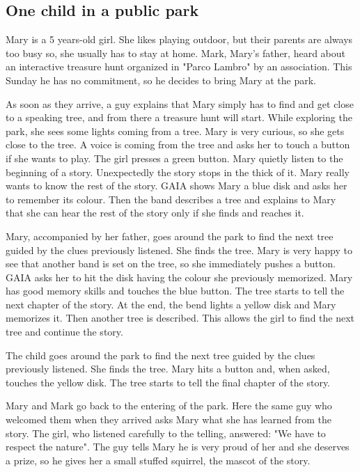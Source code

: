\documentclass[a4paper,11pt]{report}
\begin{document}
\subsection{One child in a public park}
Mary is a 5 years-old girl. She likes playing outdoor, but their parents are always too busy so, she usually has to stay at home. Mark, Mary's father, heard about an interactive treasure hunt organized in "Parco Lambro" by an association. This Sunday he has no commitment, so he decides to bring Mary at the park.\par 
As soon as they arrive, a guy explains that Mary simply has to find and get close to a speaking tree, and from there a treasure hunt will start. While exploring the park, she sees some lights coming from a tree. Mary is very curious, so she gets close to the tree. A voice is coming from the tree and asks her to touch a button if she wants to play. The girl presses a green button. Mary quietly listen to the beginning of a story. Unexpectedly the story stops in the thick of it. Mary really wants to know the rest of the story. GAIA shows Mary a blue disk and asks her to remember its colour. Then the band describes a tree and explains to Mary that she can hear the rest of the story only if she finds and reaches it.\par
Mary, accompanied by her father, goes around the park to find the next tree guided by the clues previously listened. She finds the tree. Mary is very happy to see that another band is set on the tree, so she immediately pushes a button. GAIA asks her to hit the disk having the colour she previously memorized. Mary has good memory skills and touches the blue button. The tree starts to tell the next chapter of the story. At the end, the bend lights a yellow disk and Mary memorizes it. Then another tree is described. This allows the girl to find the next tree and continue the story.\par
The child goes around the park to find the next tree guided by the clues previously listened. She finds the tree. Mary hits a button and, when asked, touches the yellow disk. The tree starts to tell the final chapter of the story.\par
Mary and Mark go back to the entering of the park. Here the same guy who welcomed them when they arrived asks Mary what she has learned from the story. The girl, who listened carefully to the telling, answered: "We have to respect the nature". The guy tells Mary he is very proud of her and she deserves a prize, so he gives her a small stuffed squirrel, the mascot of the story.
\end{document}
